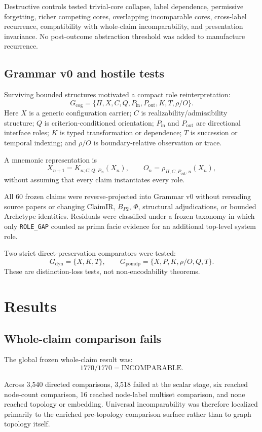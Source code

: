 \documentclass[11pt]{article}
\newcommand{\Pin}{P_{\mathrm{in}}}
\newcommand{\Pout}{P_{\mathrm{out}}}
\newcommand{\Gsys}{G_{\mathrm{cog}}}
\begin{document}
Destructive controls tested trivial-core collapse, label dependence, permissive forgetting, richer competing cores, overlapping incomparable cores, cross-label recurrence, compatibility with whole-claim incomparability, and presentation invariance. No post-outcome abstraction threshold was added to manufacture recurrence.

\subsection{Grammar v0 and hostile tests}

Surviving bounded structures motivated a compact role reinterpretation:
\[
\Gsys=\{\Pi,X,C,Q,\Pin,\Pout,K,T,\rho/O\}.
\]
Here \(X\) is a generic configuration carrier; \(C\) is realizability/admissibility structure; \(Q\) is criterion-conditioned orientation; \(\Pin\) and \(\Pout\) are directional interface roles; \(K\) is typed transformation or dependence; \(T\) is succession or temporal indexing; and \(\rho/O\) is boundary-relative observation or trace.

A mnemonic representation is
\[
X_{n+1}=K_{n;C,Q,\Pin}(X_n),
\qquad
O_n=\rho_{\Pi,C,\Pout,n}(X_n),
\]
without assuming that every claim instantiates every role.

All 60 frozen claims were reverse-projected into Grammar v0 without rereading source papers or changing ClaimIR, \(B_{P2}\), \(\Phi\), structural adjudications, or bounded Archetype identities. Residuals were classified under a frozen taxonomy in which only \texttt{ROLE\_GAP} counted as prima facie evidence for an additional top-level system role.

Two strict direct-preservation comparators were tested:
\[
G_{\mathrm{dyn}}=\{X,K,T\},
\qquad
G_{\mathrm{pomdp}}=\{X,P,K,\rho/O,Q,T\}.
\]
These are distinction-loss tests, not non-encodability theorems.


\section{Results}

\subsection{Whole-claim comparison fails}
\label{sec:wholefail}

The global frozen whole-claim result was:
\[
1770/1770=\text{INCOMPARABLE}.
\]

Across 3,540 directed comparisons, 3,518 failed at the scalar stage, six reached node-count comparison, 16 reached node-label multiset comparison, and none reached topology or embedding. Universal incomparability was therefore localized primarily to the enriched pre-topology comparison surface rather than to graph topology itself.
\end{document}
